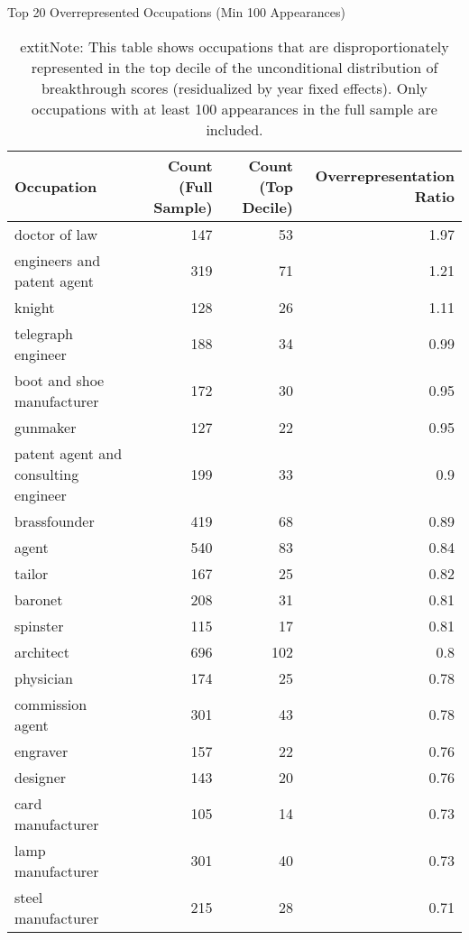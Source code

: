 \begin{table}[H]
\centering
\caption{Top 20 Overrepresented Occupations (Min 100 Appearances)}
\label{tab:top_occ}
\begin{tabular}{lrrr}
\toprule
Occupation & Count (Full Sample) & Count (Top Decile) & Overrepresentation Ratio \\
\midrule
doctor of law & 147 & 53 & 1.97 \\
engineers and patent agent & 319 & 71 & 1.21 \\
knight & 128 & 26 & 1.11 \\
telegraph engineer & 188 & 34 & 0.99 \\
boot and shoe manufacturer & 172 & 30 & 0.95 \\
gunmaker & 127 & 22 & 0.95 \\
patent agent and consulting engineer & 199 & 33 & 0.9 \\
brassfounder & 419 & 68 & 0.89 \\
agent & 540 & 83 & 0.84 \\
tailor & 167 & 25 & 0.82 \\
baronet & 208 & 31 & 0.81 \\
spinster & 115 & 17 & 0.81 \\
architect & 696 & 102 & 0.8 \\
physician & 174 & 25 & 0.78 \\
commission agent & 301 & 43 & 0.78 \\
engraver & 157 & 22 & 0.76 \\
designer & 143 & 20 & 0.76 \\
card manufacturer & 105 & 14 & 0.73 \\
lamp manufacturer & 301 & 40 & 0.73 \\
steel manufacturer & 215 & 28 & 0.71 \\
\bottomrule
\end{tabular}
\caption*{	extit{Note}: This table shows occupations that are disproportionately represented in the top decile of the unconditional distribution of breakthrough scores (residualized by year fixed effects). Only occupations with at least 100 appearances in the full sample are included.}
\end{table}
